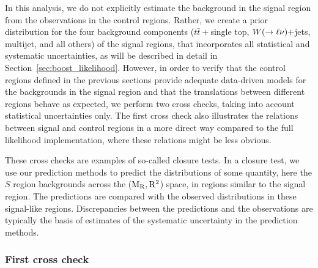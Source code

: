 
In this analysis, we do not explicitly estimate the background in the signal region from the
observations in the control regions. Rather, we create a prior distribution for the four background
components ($t\bar{t}+$single top, $W(\rightarrow \ell\nu)+$jets, multijet,
and all others) of the signal regions, that incorporates all statistical and systematic
uncertainties, as
will be described in detail in Section~\ref{sec:boost_likelihood}. 
However, in order to verify that the control regions defined in the previous sections provide
adequate data-driven models for the backgrounds in the signal region and that the translations
between different regions behave as expected, we perform two cross checks, taking into account
statistical uncertainties only. 
The first cross check also illustrates the relations between signal and control regions in a more
direct way compared to the full likelihood implementation, where these relations might be less
obvious. 

These cross checks are examples of so-called closure tests. In a closure test, we use our prediction
methods to predict the distributions of some quantity, here the $S$ region backgrounds across the
($\mathrm{M_R}, \mathrm{R^2}$) space, in regions similar to the signal region. The predictions are compared with the
observed distributions in these signal-like regions. Discrepancies between the predictions and the
observations are typically the basis of estimates of the systematic uncertainty in the prediction
methods.

\subsubsection{First cross check}

